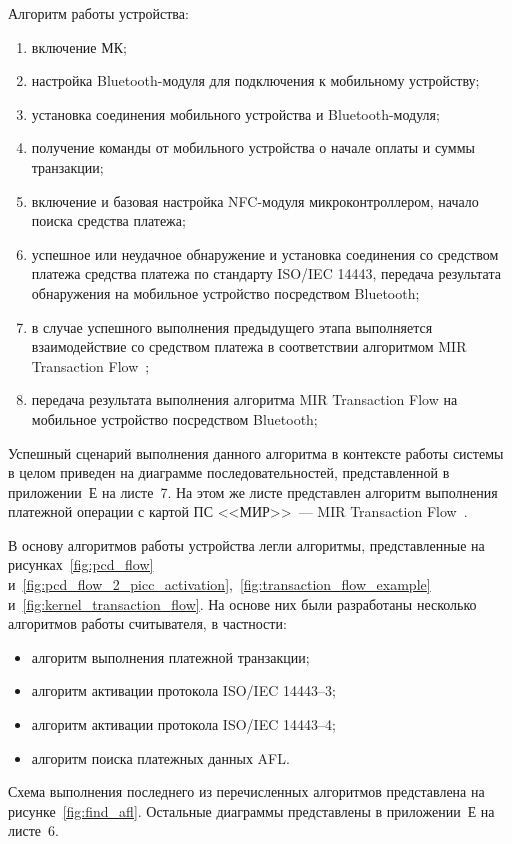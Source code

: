 Алгоритм работы устройства:
\begin{enumerate}
    \item включение МК;
    \item настройка Bluetooth-модуля для подключения к мобильному устройству;
    \item установка соединения мобильного устройства и Bluetooth-модуля;
    \item получение команды от мобильного устройства о начале оплаты и суммы транзакции;
    \item включение и базовая настройка NFC-модуля микроконтроллером, начало поиска средства платежа;
    \item успешное или неудачное обнаружение и установка соединения со средством платежа средства платежа по стандарту ISO/IEC 14443, передача результата обнаружения на мобильное устройство посредством Bluetooth;
    \item в случае успешного выполнения предыдущего этапа выполняется взаимодействие со средством платежа в соответствии алгоритмом MIR Transaction Flow~\cite{book_mir};
    \item передача результата выполнения алгоритма MIR Transaction Flow на мобильное устройство посредством Bluetooth;
\end{enumerate}

Успешный сценарий выполнения данного алгоритма в контексте работы системы в целом приведен на диаграмме последовательностей, представленной в приложении~Е на листе~7.
На этом же листе представлен алгоритм выполнения платежной операции с картой ПС <<МИР>>~--- MIR Transaction Flow~\cite{book_mir}.

В основу алгоритмов работы устройства легли алгоритмы, представленные на рисунках~\ref{fig:pcd_flow} и~\ref{fig:pcd_flow_2_picc_activation},~\ref{fig:transaction_flow_example} и~\ref{fig:kernel_transaction_flow}.
На основе них были разработаны несколько алгоритмов работы считывателя, в частности:

\begin{itemize}
    \item алгоритм выполнения платежной транзакции;
    \item алгоритм активации протокола ISO/IEC 14443--3;
    \item алгоритм активации протокола ISO/IEC 14443--4;
    \item алгоритм поиска платежных данных AFL.
\end{itemize}

Схема выполнения последнего из перечисленных алгоритмов представлена на рисунке~\ref{fig:find_afl}.
Остальные диаграммы представлены в приложении~Е на листе~6.

